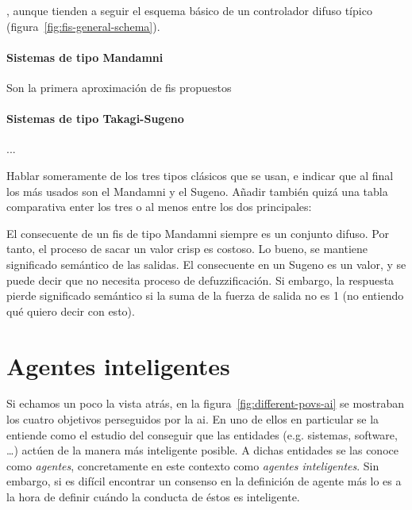 , aunque tienden a seguir el esquema básico de un controlador difuso típico (figura~\ref{fig:fis-general-schema}).

\paragraph{Sistemas de tipo Mandamni}

Son la primera aproximación de \gls{fis} propuestos

\paragraph{Sistemas de tipo Takagi-Sugeno}

...

Hablar someramente de los tres tipos clásicos que se usan, e indicar que al final los más usados son el Mandamni y el Sugeno. Añadir también quizá una tabla comparativa enter los tres o al menos entre los dos principales:

El consecuente de un \ac{fis} de tipo Mandamni siempre es un conjunto difuso. Por tanto, el proceso de sacar un valor crisp es costoso. Lo bueno, se mantiene significado semántico de las salidas. El consecuente en un Sugeno es un valor, y se puede decir que no necesita proceso de defuzzificación. Si embargo, la respuesta pierde significado semántico si la suma de la fuerza de salida no es 1 (no entiendo qué quiero decir con esto).

\section{Agentes inteligentes}
\label{ch:ci:s:agent-concept}

Si echamos un poco la vista atrás, en la figura~\ref{fig:different-povs-ai} se mostraban los cuatro objetivos perseguidos por la \ac{ai}. En uno de ellos en particular se la entiende como el estudio del conseguir que las entidades (e.g. sistemas, software, \ldots) actúen de la manera más inteligente posible. A dichas entidades se las conoce como \textit{agentes}, concretamente en este contexto como \textit{agentes inteligentes}. Sin embargo, si es difícil encontrar un consenso en la definición de agente más lo es a la hora de definir cuándo la conducta de éstos es inteligente.


